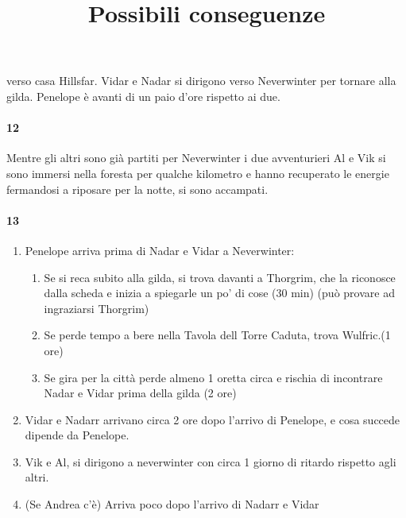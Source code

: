 \documentclass{article}
\begin{document}
verso casa Hillsfar. Vidar e Nadar si dirigono verso Neverwinter per tornare alla gilda. Penelope è avanti di un paio d'ore rispetto ai due. 
                  \paragraph{12}
Mentre gli altri sono già partiti per Neverwinter i due avventurieri Al e Vik si sono immersi nella foresta per qualche kilometro e hanno recuperato le energie fermandosi a riposare per la notte, si sono accampati. 
                  \paragraph{13} 
\title{Possibili conseguenze}
   \begin{enumerate}
       \item  Penelope arriva prima di Nadar e Vidar a Neverwinter: 
        \begin{enumerate}
            \item Se si reca subito alla gilda, si trova davanti a Thorgrim, che la riconosce dalla scheda e inizia a spiegarle un po' di cose (30 min) (può provare ad ingraziarsi Thorgrim)
            \item Se perde tempo a bere nella Tavola dell Torre Caduta, trova Wulfric.(1 ore) 
            \item Se gira per la città perde almeno 1 oretta circa e rischia di incontrare Nadar e Vidar prima della gilda (2 ore)
        \end{enumerate}
        \item  Vidar e Nadarr arrivano      circa 2 ore dopo l'arrivo di Penelope, e cosa succede dipende da Penelope.
        \item Vik e Al, si dirigono a neverwinter con circa 1 giorno di ritardo rispetto agli altri.
        \item (Se Andrea c'è) Arriva poco dopo l'arrivo di Nadarr e Vidar
   \end{enumerate}
\end{document}
